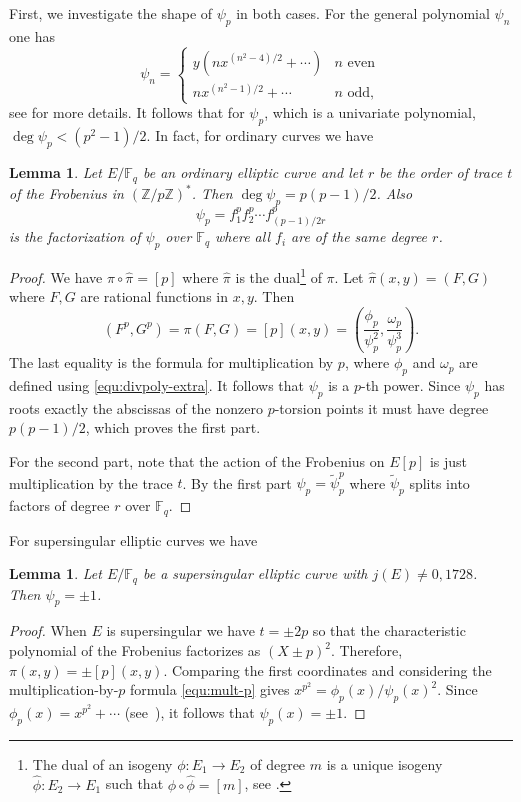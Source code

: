 \documentclass[11pt]{article}
\theoremstyle{plain}
\newtheorem{lemma}[theorem]{Lemma}
\theoremstyle{definition}
\def\Z{\ensuremath{\mathbb{Z}}}
\def\F{\ensuremath{\mathbb{F}}}
\begin{document}
First, we investigate the shape of $\psi_p$ in both cases. For the general polynomial $\psi_n$ one 
has
\[
\psi_n =
\begin{cases}
	y(nx^{(n^2 - 4) / 2} + \cdots) & n \text{ even} \\
	nx^{(n^2 - 1) / 2} + \cdots & n \text{ odd},
\end{cases}
\]
see \cite{washington2008} for more details. It follows that for $\psi_p$, which is a univariate 
polynomial, $\deg \psi_p < (p^2 - 1) / 2$. In fact, for ordinary curves we have
\begin{lemma}
	\label{lem:ord_divpoly}
	Let $E/\F_q$ be an ordinary elliptic curve and let $r$ be the order of trace $t$ of the 
	Frobenius in $(\Z / p\Z)^*$. Then $\deg \psi_p = p(p - 1) / 2$. Also
	\[ \psi_p = f_1^pf_2^p \cdots f_{(p - 1) / 2r}^p \]
	is the factorization of $\psi_p$ over $\F_q$ where all $f_i$ are of the same degree $r$.
\end{lemma}
\begin{proof}
	We have $\pi \circ \hat{\pi} = [p]$ where $\hat{\pi}$ is the dual\footnote{The dual of an 
	isogeny $\phi: E_1 \rightarrow E_2$ of degree $m$ is a unique isogeny $\hat{\phi}: E_2 
	\rightarrow E_1$ such that $\phi \circ \hat{\phi} = [m]$, see  
	\cite[III.6]{silverman2009arithmetic}.} of $\pi$. Let $\hat{\pi}(x, y) = (F, G)$ where $F, G$ 
	are rational functions in $x, y$. Then
	\begin{equation}
	\label{equ:mult-p}
		(F^p, G^p) = \pi(F, G) = [p](x, y) = \left( \frac{\phi_p}{\psi_p^2}, 		
		\frac{\omega_p}{\psi_p^3} \right).
	\end{equation}
	The last equality is the formula for multiplication by $p$, where $\phi_p$ and $\omega_p$ are
	defined using \eqref{equ:divpoly-extra}. It follows that $\psi_p$ is a $p$-th power. Since 
	$\psi_p$ has roots exactly the abscissas of the nonzero $p$-torsion points it must have degree 
	$p(p - 1) / 2$, which proves the first part.
	
	For the second part, note that the action of the Frobenius on $E[p]$ is just multiplication by 
	the trace $t$. By the first part $\psi_p = \tilde{\psi}_p^p$ where $\tilde{\psi}_p$ splits into 
	factors of degree $r$ over $\F_q$.
\end{proof}
For supersingular elliptic curves we have
\begin{lemma}
	\label{lem:ss_divpoly}
	Let $E/\F_q$ be a supersingular elliptic curve with $j(E) \ne 0, 1728$. Then $\psi_p = \pm 1$.
\end{lemma}
\begin{proof}
	When $E$ is supersingular we have $t = \pm 2p$ so that the characteristic polynomial of the 
	Frobenius factorizes as $(X \pm p)^2$. Therefore, $\pi(x, y) = \pm [p](x, y)$. Comparing the 
	first coordinates and considering the multiplication-by-$p$ formula \eqref{equ:mult-p} gives 
	$x^{p^2} = \phi_p(x) / \psi_p(x)^2$. Since $\phi_p(x) = x^{p^2} + \cdots$	
	(see~\cite{washington2008}), it follows that $\psi_p(x) = \pm 1$.
\end{proof}
\end{document}
